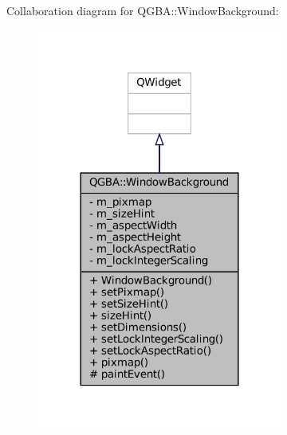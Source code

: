 Collaboration diagram for Q\+G\+BA\+:\+:Window\+Background\+:
\nopagebreak
\begin{figure}[H]
\begin{center}
\leavevmode
\includegraphics[width=228pt]{class_q_g_b_a_1_1_window_background__coll__graph}
\end{center}
\end{figure}

